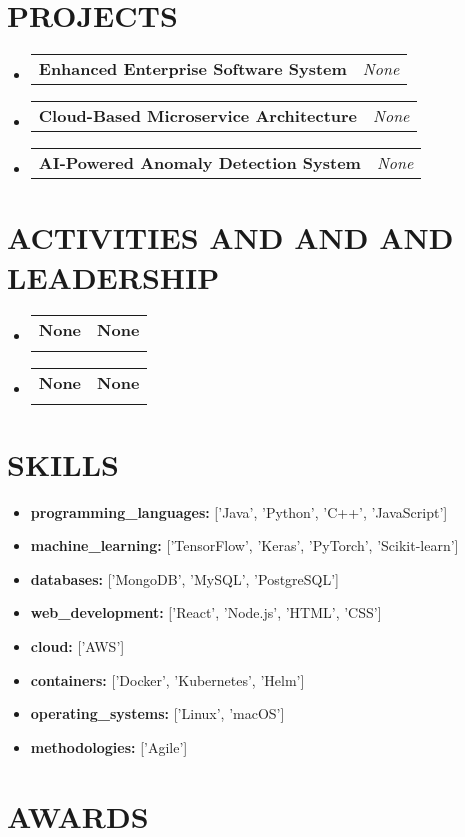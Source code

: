 \documentclass[letterpaper,11pt]{article}
\makeatletter
\newcommand{\resumeItem}[1]{\item\small{{#1 \vspace{-3pt}}}}
\newcommand{\resumeSubheading}[4]{\vspace{-2pt}\item\begin{tabular*}{0.97\textwidth}[t]{l@{\extracolsep{\fill}}r}\textbf{#1} & #2 \\\textit{\small#3} & \textit{\small #4} \\\end{tabular*}\vspace{-7pt}}
\newcommand{\resumeProjectHeading}[2]{\item\begin{tabular*}{0.97\textwidth}{l@{\extracolsep{\fill}}r}\small#1 & #2 \\\end{tabular*}\vspace{-7pt}}
\newcommand{\resumeSubHeadingListStart}{\begin{itemize}[leftmargin=0.15in, label={}]}
\newcommand{\resumeSubHeadingListEnd}{\end{itemize}}
\makeatother
\begin{document}
\section{{\fontsize{9pt}{20pt}\selectfont \textbf{PROJECTS}}}
\resumeSubHeadingListStart
\resumeProjectHeading{\textbf{Enhanced Enterprise Software System}}{\textit{None}}
\vspace{-6pt}
\resumeProjectHeading{\textbf{Cloud-Based Microservice Architecture}}{\textit{None}}
\vspace{-6pt}
\resumeProjectHeading{\textbf{AI-Powered Anomaly Detection System}}{\textit{None}}

\resumeSubHeadingListEnd\vspace{-15pt}
\section{{\fontsize{9pt}{20pt}\selectfont \textbf{ACTIVITIES AND AND AND LEADERSHIP}}}
\resumeSubHeadingListStart
\resumeSubheading{None}{\textbf{None}}{}{}
\vspace{-17pt}

\resumeSubheading{None}{\textbf{None}}{}{}
\vspace{-17pt}

\resumeSubHeadingListEnd\vspace{-15pt}
\section{{\fontsize{9pt}{20pt}\selectfont \textbf{SKILLS}}}
\resumeSubHeadingListStart
\resumeItem{\textbf{programming\_languages:} ['Java', 'Python', 'C++', 'JavaScript']}\vspace{-7pt}
\resumeItem{\textbf{machine\_learning:} ['TensorFlow', 'Keras', 'PyTorch', 'Scikit-learn']}\vspace{-7pt}
\resumeItem{\textbf{databases:} ['MongoDB', 'MySQL', 'PostgreSQL']}\vspace{-7pt}
\resumeItem{\textbf{web\_development:} ['React', 'Node.js', 'HTML', 'CSS']}\vspace{-7pt}
\resumeItem{\textbf{cloud:} ['AWS']}\vspace{-7pt}
\resumeItem{\textbf{containers:} ['Docker', 'Kubernetes', 'Helm']}\vspace{-7pt}
\resumeItem{\textbf{operating\_systems:} ['Linux', 'macOS']}\vspace{-7pt}
\resumeItem{\textbf{methodologies:} ['Agile']}
\resumeSubHeadingListEnd\vspace{-15pt}
\section{{\fontsize{9pt}{20pt}\selectfont \textbf{AWARDS}}}
\resumeSubHeadingListStart
\resumeSubHeadingListEnd\vspace{-15pt}
\end{document}
